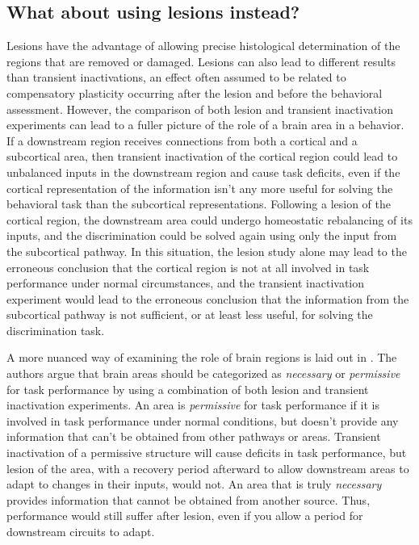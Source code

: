 \subsection{What about using lesions instead?}
Lesions have the advantage of allowing precise histological determination of the regions that are removed or damaged. 
%
Lesions can also lead to different results than transient inactivations, an effect often assumed to be related to compensatory plasticity occurring after the lesion and before the behavioral assessment. 
%
However, the comparison of both lesion and transient inactivation experiments can lead to a fuller picture of the role of a brain area in a behavior. 
%
If a downstream region receives connections from both a cortical and a subcortical area, then transient inactivation of the cortical region could lead to unbalanced inputs in the downstream region and cause task deficits, even if the cortical representation of the information isn't any more useful for solving the behavioral task than the subcortical representations. 
%
Following a lesion of the cortical region, the downstream area could undergo homeostatic rebalancing of its inputs, and the discrimination could be solved again using only the input from the subcortical pathway. 
%
In this situation, the lesion study alone may lead to the erroneous conclusion that the cortical region is not at all involved in task performance under normal circumstances, and the transient inactivation experiment would lead to the erroneous conclusion that the information from the subcortical pathway is not sufficient, or at least less useful, for solving the discrimination task. 

A more nuanced way of examining the role of brain regions is laid out in \citet{Otchy2015}. 
%
The authors argue that brain areas should be categorized as \emph{necessary} or \emph{permissive} for task performance by using a combination of both lesion and transient inactivation experiments. 
%
An area is \emph{permissive} for task performance if it is involved in task performance under normal conditions, but doesn't provide any information that can't be obtained from other pathways or areas. 
%
Transient inactivation of a permissive structure will cause deficits in task performance, but lesion of the area, with a recovery period afterward to allow downstream areas to adapt to changes in their inputs, would not.
%
An area that is truly \emph{necessary} provides information that cannot be obtained from another source. 
%
Thus, performance would still suffer after lesion, even if you allow a period for downstream circuits to adapt.

